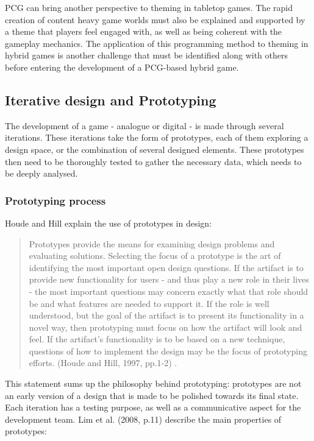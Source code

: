 PCG can bring another perspective to theming in tabletop games. The rapid creation of content heavy game worlds must also be explained and supported by a theme that players feel engaged with, as well as being coherent with the gameplay mechanics. The application of this programming method to theming in hybrid games is another challenge that must be identified along with others before entering the development of a PCG-based hybrid game.
\subsection{Iterative design and Prototyping}
\label{sec:proto}
The development of a game - analogue or digital - is made through several iterations. These iterations take the form of prototypes, each of them exploring a design space, or the combination of several designed elements. These prototypes then need to be thoroughly tested to gather the necessary data, which needs to be deeply analysed.
\subsubsection{Prototyping process}
Houde and Hill explain the use of prototypes in design:
\begin{quotation}
Prototypes provide the means for examining design problems and evaluating solutions. Selecting the focus of a prototype is the art of identifying the most important open design questions. If the artifact is to provide new functionality for users - and thus play a new role in their lives - the most important questions may concern exactly what that role should be and what features are needed to support it. If the role is well understood, but the goal of the artifact is to present its functionality in a novel way, then prototyping must focus on how the artifact will look and feel. If the artifact's functionality is to be based on a new technique, questions of how to implement the design may be the focus of prototyping efforts. (Houde and Hill, 1997, pp.1-2) \cite{book:proto}.
\end{quotation}
This statement sums up the philosophy behind prototyping: prototypes are not an early version of a design that is made to be polished towards its final state. Each iteration has a testing purpose, as well as a communicative aspect for the development team. Lim et al. (2008, p.11) \cite{book:proto} describe the main properties of prototypes:

